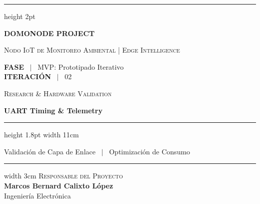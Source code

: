 \documentclass[11pt,a4paper]{article}
\newcommand{\faseactual}{MVP: Prototipado Iterativo}
\begin{document}
\begin{titlepage}
    \hrule height 2pt
    \vspace{0.4cm}
    
    \begin{flushleft}
        \begin{minipage}[t]{0.60\textwidth}
            {\color{BLogicNavy}\Large{}\textbf{DOMONODE PROJECT}\par}
            \vspace{0.12cm}
            {\color{gray}\footnotesize\scshape Nodo IoT de Monitoreo Ambiental | Edge Intelligence}
        \end{minipage}
        \begin{minipage}[t]{0.39\textwidth}
            \raggedleft
            {\color{gray}\scriptsize 
            \textbf{FASE} \ $|$ \ \faseactual \\ 
            \textbf{ITERACIÓN} \ $|$ \ 02}
        \end{minipage}
    \end{flushleft}
    
    \vspace{5.5cm}

    \begin{flushleft}
        {\color{gray}\footnotesize\scshape Research \& Hardware Validation}\par
        \vspace{0.25cm}
        {\Huge{}\textbf{UART Timing \& Telemetry}\par}
        \vspace{0.4cm}
        {\color{BLogicNavy}\hrule height 1.8pt width 11cm} 
        \vspace{0.6cm}
        {\small\textsf{Validación de Capa de Enlace \ $|$ \ Optimización de Consumo}}
    \end{flushleft}

    \vfill

    \begin{flushleft}
        \begin{minipage}{0.5\textwidth}
            \hrule width 3cm
            \vspace{0.3cm}
            {\footnotesize\color{gray}\scshape Responsable del Proyecto}\\
            \vspace{0.15cm}
            \textbf{Marcos Bernard Calixto López}\\
            {\small Ingeniería Electrónica}
        \end{minipage}
    \end{flushleft}


\end{titlepage}
\end{document}
